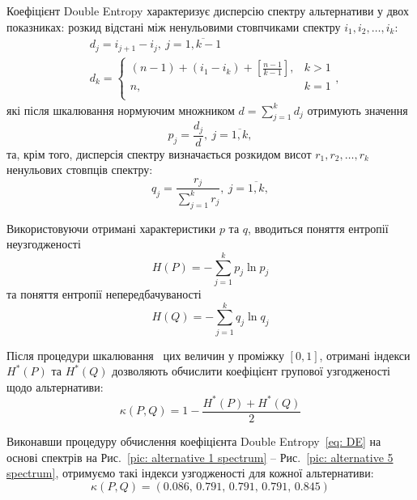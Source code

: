 \documentclass{mathreport}
\begin{document}
Коефіцієнт Double Entropy характеризує дисперсію спектру альтернативи у двох показниках: розкид відстані між ненульовими стовпчиками спектру $i_1,i_2,\ldots,i_k:$ 
\begin{align}
    & d_j = i_{j+1} - i_{j},\ j=\overline{1,k-1} \\
    & d_k =
    \begin{cases*}
        (n-1) + (i_1-i_k) + \left[ \frac{n-1}{k-1} \right], & k > 1 \\
        n,                                                   & k = 1 \\
    \end{cases*},
\end{align}
які після шкалювання нормуючим множником $d=\sum\limits_{j=1}^{k} d_j$ отримують значення
\begin{equation}
    p_j=\frac{d_j}{d},\ j=\overline{1,k},
\end{equation}
та, крім того, дисперсія спектру визначається розкидом висот $r_1,r_2,\ldots,r_k$ ненульових стовпців спектру:
\begin{equation}
    q_j=\frac{r_j}{\sum\limits_{j=1}^{k} r_j},\ j=\overline{1,k},
\end{equation}

\newpage
Використовуючи отримані характеристики $p$ та $q$, вводиться поняття ентропії неузгодженості
\begin{equation}\label{eq: H(P)}
    H(P)=-\sum\limits_{j=1}^{k} p_j\ln{p_j}
\end{equation}
та поняття ентропії непередбачуваності
\begin{equation}\label{eq: H(Q)}
    H(Q)=-\sum\limits_{j=1}^{k} q_j\ln{q_j}
\end{equation}

Після процедури шкалювання~\cite[додаток <<Supplemental Material>>]{Olenko2015} цих величин у проміжку $[0,1]$, отримані індекси $H^*(P)$ та $H^*(Q)$ дозволяють обчислити коефіцієнт групової узгодженості щодо альтернативи: 
\begin{equation}\label{eq: DE}
    \kappa(P,Q) = 1 - \frac{H^*(P) + H^*(Q)}{2}
\end{equation}

Виконавши процедуру обчислення коефіцієнта Double Entropy~\eqref{eq: DE} на основі спектрів на Рис.~\ref{pic: alternative 1 spectrum} -- Рис.~\ref{pic: alternative 5 spectrum}, отримуємо такі індекси узгодженості для кожної альтернативи:
\begin{equation}\label{eq: DE value}
    \kappa(P,Q) = (0.086,\, 0.791,\, 0.791,\, 0.791,\, 0.845)
\end{equation}
\end{document}
